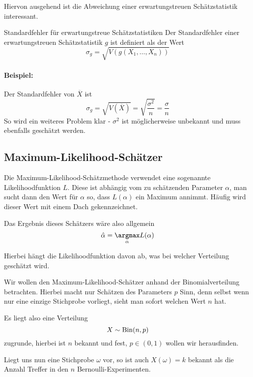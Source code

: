 Hiervon ausgehend ist die Abweichung einer erwartungstreuen Schätzstatistik interessant.
\begin{definition}{Standardfehler für erwartungstreue Schätzstatistiken}
	Der Standardfehler einer erwartungstreuen Schätzstatistik $g$ ist definiert als der Wert%
	\begin{equation*}
		\sigma_g = \sqrt{V(g(X_1,\ldots,X_n))}
	\end{equation*}
\end{definition}
\paragraph{Beispiel:}
Der Standardfehler von $\overline X$ ist
\begin{equation*}
	\sigma_g = \sqrt{V(\overline X)}= \sqrt{\frac{\sigma^2}{n}}=\frac\sigma n
\end{equation*}
So wird ein weiteres Problem klar - $\sigma^2$ ist möglicherweise unbekannt und muss ebenfalls geschätzt werden.



\subsection{Maximum-Likelihood-Schätzer}
Die Maximum-Likelihood-Schätzmethode verwendet eine sogenannte Likelihoodfunktion $L$. Diese ist abhängig vom zu schätzenden Parameter $\alpha$, man sucht dann den Wert für $\alpha$ so, dass $L(\alpha)$ ein Maximum annimmt. Häufig wird dieser Wert mit einem Dach gekennzeichnet. 

Das Ergebnis dieses Schätzers wäre also allgemein
\begin{equation*}
	\hat\alpha = \underset\alpha\argmax L(\alpha)
\end{equation*}

Hierbei hängt die Likelihoodfunktion davon ab, was bei welcher Verteilung geschätzt wird. 


Wir wollen den Maximum-Likelihood-Schätzer anhand der Binomialverteilung betrachten.
Hierbei macht nur Schätzen des Parameters $p$ Sinn, denn selbst wenn nur eine einzige Stichprobe vorliegt, sieht man sofort welchen Wert $n$ hat.

Es liegt also eine Verteilung 
\begin{equation*}
	X\sim\operatorname{Bin}(n,p)
\end{equation*}
zugrunde, hierbei ist $n$ bekannt und fest, $p\in(0,1)$ wollen wir herausfinden.

Liegt uns nun eine Stichprobe $\omega$ vor, so ist auch $X(\omega)=k$ bekannt als die Anzahl Treffer in den $n$ Bernoulli-Experimenten.

